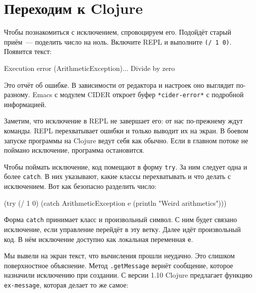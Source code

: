 \section{Переходим к Clojure}

Чтобы познакомиться с исключением, спровоцируем его. Подойдёт старый
приём~--- поделить число на ноль. Включите REPL и выполните
\verb|(/ 1 0)|. Появится текст:


\begin{english}
  \begin{text}
Execution error (ArithmeticException)...
Divide by zero
  \end{text}
\end{english}

Это отчёт об ошибке. В зависимости от редактора и настроек оно выглядит
по-разному. Emacs с модулем CIDER откроет буфер \verb|*cider-error*|
с подробной информацией.


Заметим, что исключение в REPL не завершает его: от нас по-прежнему ждут
команды. REPL перехватывает ошибки и только выводит их на экран. В боевом
запуске программы на Clojure ведут себя как обычно. Если в главном потоке не
поймано исключение, программа остановится.

Чтобы поймать исключение, код помещают в форму \verb|try|. За ним следует одна
и более \verb|catch|. В них указывают, какие классы перехватывать и что делать
с исключением. Вот как безопасно разделить число:


\begin{english}
  \begin{clojure}
(try
  (/ 1 0)
  (catch ArithmeticException e
    (println "Weird arithmetics")))
  \end{clojure}
\end{english}

Форма \verb|catch| принимает класс и произвольный символ. С ним будет связано
исключение, если управление перейдёт в эту ветку. Далее идёт произвольный код. В
нём исключение доступно как локальная переменная \verb|e|.


Мы вывели на экран текст, что вычисления прошли неудачно. Это слишком
поверхностное объяснение. Метод \verb|.getMessage| вернёт сообщение, которое
назначили исключению при создании. С версии 1.10 Clojure предлагает функцию
\verb|ex-message|, которая делает то же самое:

